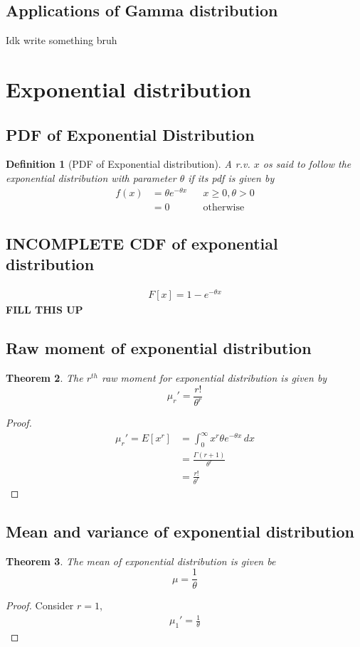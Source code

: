 \documentclass[oneside,11pt,pdftex]{book}%
\numberwithin{equation}{section}
\newtheorem{theorem}{Theorem}[chapter]%
\newtheorem{definition}[theorem]{Definition}
\numberwithin{section}{chapter}
\numberwithin{equation}{chapter}
\begin{document}
\subsection{Applications of Gamma distribution}
Idk write something bruh

\section{Exponential distribution}
\subsection{PDF of Exponential Distribution}
\begin{definition}[PDF of Exponential distribution]
	A r.v. $ x $ os said to follow the exponential distribution with parameter $ \theta  $ if its pdf is given by 
	\begin{align*}
		f(x)&= \theta e^{-\theta x} && x\geq 0, \theta > 0\\
		&= 0 && \text{otherwise}
	\end{align*}
\end{definition}


\subsection{INCOMPLETE CDF of exponential distribution}
\begin{align*}
	F[x]=1-e^{-\theta x}
\end{align*}
\textbf{FILL THIS UP}
\subsection{Raw moment of exponential distribution}

\begin{theorem}
	The $ r^{th} $ raw moment for exponential distribution is given by \[ \mu_r'=\frac{r!}{\theta^r} \]
\end{theorem}
\begin{proof}
	\begin{align*}
		\mu_r'=E[x^r]&=\int_0^\infty x^r \theta e^{-\theta x}\, dx\\
		&=\frac{\Gamma(r+1)}{\theta^r}\\
		&= \frac{r!}{\theta^r}
	\end{align*}
\end{proof}

\subsection{Mean and variance of exponential distribution}
\begin{theorem}
	The mean of exponential distribution is given be \[ \mu=\frac{1}{\theta} \]
\end{theorem}
\begin{proof}
	Consider $ r=1 $,
	\begin{align*}
		\mu_1'=\frac{1}{\theta}
	\end{align*}
\end{proof}
\end{document}

